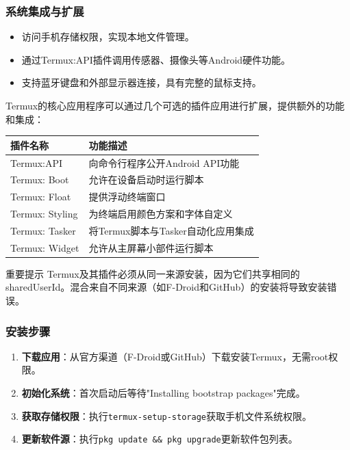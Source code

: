 \subsubsection*{系统集成与扩展}

\begin{itemize}
  \item 访问手机存储权限，实现本地文件管理。
  \item 通过Termux:API插件调用传感器、摄像头等Android硬件功能。
  \item 支持蓝牙键盘和外部显示器连接，具有完整的鼠标支持。
\end{itemize}


Termux的核心应用程序可以通过几个可选的插件应用进行扩展，提供额外的功能和集成：

\begin{center}
\begin{tabularx}{\linewidth}{|X|X|}
\hline
\textbf{插件名称} & \textbf{功能描述} \tabularnewline
\hline
Termux:API & 向命令行程序公开Android API功能 \tabularnewline
Termux: Boot & 允许在设备启动时运行脚本 \tabularnewline
Termux: Float & 提供浮动终端窗口 \tabularnewline
Termux: Styling & 为终端启用颜色方案和字体自定义 \tabularnewline
Termux: Tasker & 将Termux脚本与Tasker自动化应用集成 \tabularnewline
Termux: Widget & 允许从主屏幕小部件运行脚本 \tabularnewline
\hline
\end{tabularx}
\end{center}

\begin{tcbwarn}{重要提示}
Termux及其插件必须从同一来源安装，因为它们共享相同的sharedUserId。混合来自不同来源（如F-Droid和GitHub）的安装将导致安装错误。

\end{tcbwarn}


\subsubsection*{安装步骤}

\begin{enumerate}
  \item \textbf{下载应用}：从官方渠道（F-Droid或GitHub）下载安装Termux，无需root权限。
  \item \textbf{初始化系统}：首次启动后等待"Installing bootstrap packages"完成。
  \item \textbf{获取存储权限}：执行\texttt{termux-\allowbreak setup-\allowbreak storage}获取手机文件系统权限。
  \item \textbf{更新软件源}：执行\texttt{pkg update \&\& pkg upgrade}更新软件包列表。
\end{enumerate}

